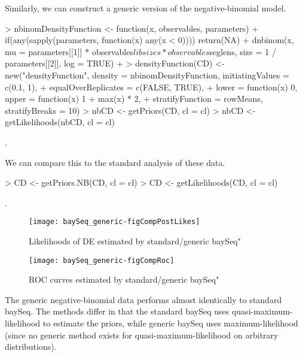 \documentclass[a4paper]{article}
\begin{document}
Similarly, we can construct a generic version of the negative-binomial model.
\begin{Schunk}
\begin{Sinput}
> nbinomDensityFunction <- function(x, observables, parameters) {
+   if(any(sapply(parameters, function(x) any(x < 0)))) return(NA)
+   dnbinom(x, mu = parameters[[1]] * observables$libsizes * observables$seglens, size = 1 / parameters[[2]], log = TRUE)
+ }
> densityFunction(CD) <- new("densityFunction", density = nbinomDensityFunction, initiatingValues = c(0.1, 1),
+                           equalOverReplicates = c(FALSE, TRUE),
+                           lower = function(x) 0, upper = function(x) 1 + max(x) * 2,
+                           stratifyFunction = rowMeans, stratifyBreaks = 10)
> nbCD <- getPriors(CD, cl = cl)
> nbCD <- getLikelihoods(nbCD, cl = cl)
\end{Sinput}
\begin{Soutput}
.
\end{Soutput}
\end{Schunk}

We can compare this to the standard analysis of these data. 
\begin{Schunk}
\begin{Sinput}
> CD <- getPriors.NB(CD, cl = cl)
> CD <- getLikelihoods(CD, cl = cl)
\end{Sinput}
\begin{Soutput}
.
\end{Soutput}
\end{Schunk}



\begin{figure}[!ht]
\begin{center}
\texttt{[image: baySeq\_generic-figCompPostLikes]}
\caption{Likelihoods of DE estimated by standard/generic baySeq"}
\label{figCompPostLikes}
\end{center}
\end{figure}

\begin{figure}[!ht]
\begin{center}
\texttt{[image: baySeq\_generic-figCompRoc]}
\caption{ROC curves estimated by standard/generic baySeq"}
\label{figCompROC}
\end{center}
\end{figure}

The generic negative-binomial data performs almost identically to standard baySeq. The methods differ in that the standard baySeq uses quasi-maximum-likelihood to estimate the priors, while generic baySeq uses maximum-likelihood (since no generic method exists for quasi-maximum-likelihood on arbitrary distributions).
\end{document}
